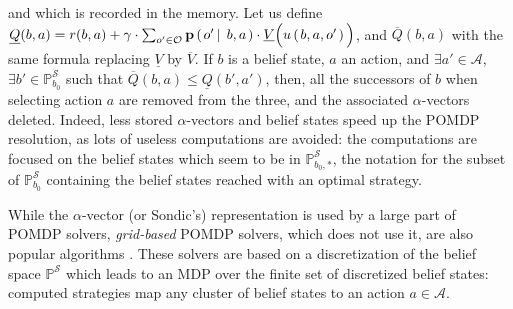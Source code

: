 and which is recorded in the memory. 
Let us define $\underline{Q}(b,a) = r(b,a) + \gamma \cdot \sum_{o' \in \mathcal{O}} \textbf{p} \left( \left.  o' \, \right| \left. \, b,a  \right. \right) \cdot \underline{V}\Big( u \left( \left.  b,a,o'  \right. \right) \Big)$,
and $\overline{Q}(b,a)$ with the same formula replacing  $\underline{V}$ by $ \overline{V}$.
If $b$ is a belief state, $a$ an action, and 
$\exists a' \in \mathcal{A}$, $\exists b' \in \mathbb{P}^{\mathcal{S}}_{b_0}$ 
such that $\overline{Q}(b,a) \leqslant \underline{Q}(b',a')$,
then, all the successors of $b$ when selecting action $a$ are
removed from the three, and the associated $\alpha$-vectors deleted.
Indeed, less stored $\alpha$-vectors and belief states speed up the POMDP resolution,
as lots of useless computations are avoided:
the computations are focused on the belief states which seem to be in $\mathbb{P}^{\mathcal{S}}_{b_0,*}$,
the notation for the subset of $\mathbb{P}^{\mathcal{S}}_{b_0}$
containing the belief states reached with an optimal strategy.

While the $\alpha$-vector (or Sondic's) representation is used by a large part
of POMDP solvers, \textit{grid-based} POMDP solvers, which does not use it, 
are also popular algorithms \cite{bonet:icml02,Lovejoy91,Brafman97aheuristic,Bonet_newgrid-based}.
These solvers are based on a discretization of the belief space $\mathbb{P}^{\mathcal{S}}$
which leads to an MDP over the finite set of discretized belief states: 
computed strategies map any cluster of belief states to an action $a \in \mathcal{A}$.

